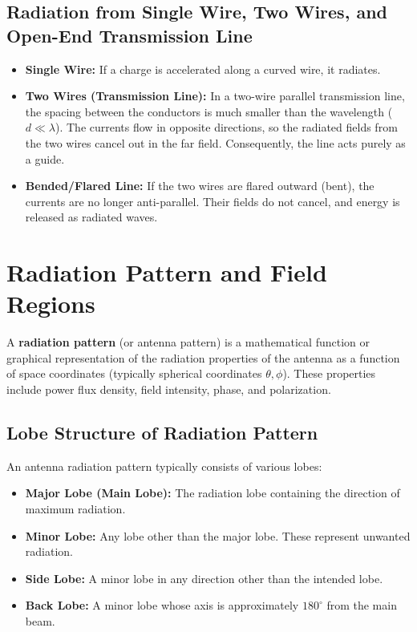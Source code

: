 \documentclass[12pt,a4paper]{article}
\begin{document}
\subsection{Radiation from Single Wire, Two Wires, and Open-End Transmission Line}
\begin{itemize}[leftmargin=*, itemsep=3pt]
  \item \textbf{Single Wire:} If a charge is accelerated along a curved wire, it radiates.
  \item \textbf{Two Wires (Transmission Line):} In a two-wire parallel transmission line, the spacing between the conductors is much smaller than the wavelength ($d \ll \lambda$). The currents flow in opposite directions, so the radiated fields from the two wires cancel out in the far field. Consequently, the line acts purely as a guide.
  \item \textbf{Bended/Flared Line:} If the two wires are flared outward (bent), the currents are no longer anti-parallel. Their fields do not cancel, and energy is released as radiated waves.
\end{itemize}

\section{Radiation Pattern and Field Regions}

\begin{tcolorbox}[defbox, title={\textbf{Definition of Radiation Pattern}}]
A \textbf{radiation pattern} (or antenna pattern) is a mathematical function or graphical representation of the radiation properties of the antenna as a function of space coordinates (typically spherical coordinates $\theta, \phi$). These properties include power flux density, field intensity, phase, and polarization.
\end{tcolorbox}

\subsection{Lobe Structure of Radiation Pattern}
An antenna radiation pattern typically consists of various lobes:
\begin{itemize}[leftmargin=*, itemsep=3pt]
  \item \textbf{Major Lobe (Main Lobe):} The radiation lobe containing the direction of maximum radiation.
  \item \textbf{Minor Lobe:} Any lobe other than the major lobe. These represent unwanted radiation.
  \item \textbf{Side Lobe:} A minor lobe in any direction other than the intended lobe.
  \item \textbf{Back Lobe:} A minor lobe whose axis is approximately $180^\circ$ from the main beam.
\end{itemize}
\end{document}
